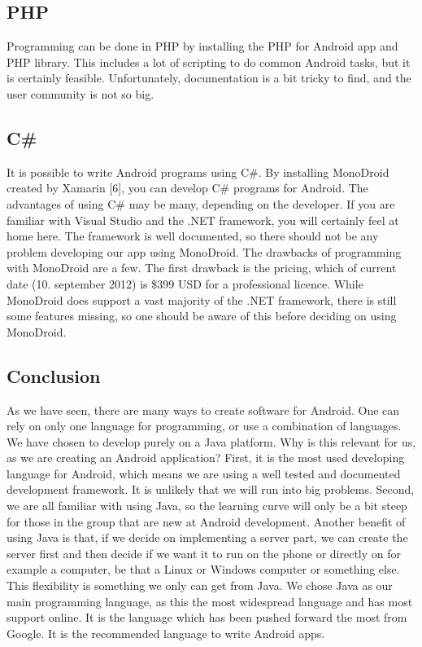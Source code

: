 \subsection{PHP}
Programming can be done in PHP by installing the PHP for Android app and PHP library. This includes a lot of scripting to do common Android tasks, but it is certainly feasible. Unfortunately, documentation is a bit tricky to find, and the user community is not so big.

\subsection{C\#}
It is possible to write Android programs using C\#. By installing MonoDroid created by Xamarin [6], you can develop C\# programs for Android. The advantages of using C\# may be many, depending on the developer. If you are familiar with Visual Studio and the .NET framework, you will certainly feel at home here. The framework is well documented, so there should not be any problem developing our app using MonoDroid.
\newline
\newline
The drawbacks of programming with MonoDroid are a few. The first drawback is the pricing, which of current date (10. september 2012) is \$399 USD for a professional licence. While MonoDroid does support a vast majority of the .NET framework, there is still some features missing, so one should be aware of this before deciding on using MonoDroid.

\subsection{Conclusion}
As we have seen, there are many ways to create software for Android. One can rely on only one language for programming, or use a combination of languages. We have chosen to develop purely on a Java platform. Why is this relevant for us, as we are creating an Android application?
\newline
\newline
First, it is the most used developing language for Android, which means we are using a well tested and documented development framework. It is unlikely that we will run into big problems. Second, we are all familiar with using Java, so the learning curve will only be a bit steep for those in the group that are new at Android development.  Another benefit of using Java is that, if we decide on implementing a server part, we can create the server first and then decide if we want it to run on the phone or directly on for example a computer, be that a Linux or Windows computer or something else. This flexibility is something we only can get from Java.
\newline
\newline
We chose Java as our main programming language, as this the most widespread language and has most support online. It is the language which has been pushed forward the most from Google. It is the recommended language to write Android apps.







